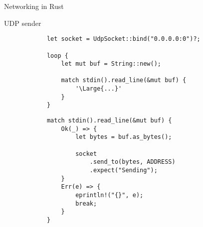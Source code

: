 \begin{frame}[fragile]{Networking in Rust}

    \begin{block}{UDP sender}
        \begin{overprint}
            \begin{verbatim}
            let socket = UdpSocket::bind("0.0.0.0:0")?;

            loop {
                let mut buf = String::new();
            
                match stdin().read_line(&mut buf) {
                    '\Large{...}'
                }
            }
            \end{verbatim}

            \begin{verbatim}
            match stdin().read_line(&mut buf) {
                Ok(_) => {
                    let bytes = buf.as_bytes();
        
                    socket
                        .send_to(bytes, ADDRESS)
                        .expect("Sending");
                }
                Err(e) => {
                    eprintln!("{}", e);
                    break;
                }
            }
            \end{verbatim}
        \end{overprint}
    \end{block}
\end{frame}
